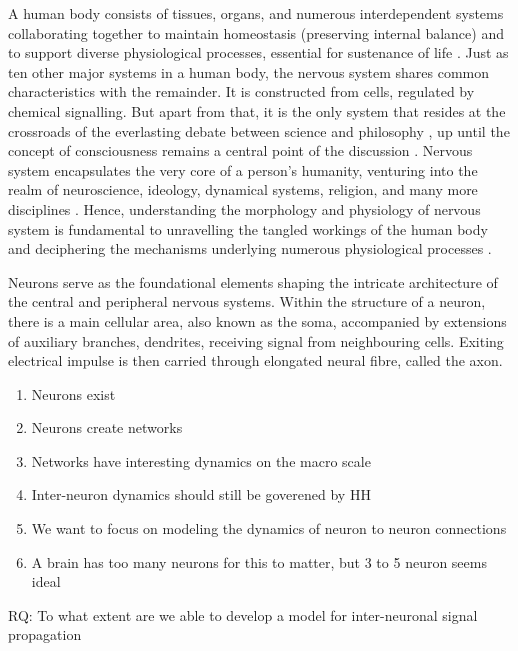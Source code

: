 \documentclass[class={myRUCProject}, crop=false]{standalone}
\begin{document}

A human body consists of tissues, organs, and numerous interdependent systems collaborating together to maintain homeostasis (preserving internal balance) and to support diverse physiological processes, essential for sustenance of life \cite{inbook2023Com}. Just as ten other major systems in a human body, the nervous system shares common characteristics with the remainder. It is constructed from cells, regulated by chemical signalling. \cite{SHOYKHET2011783} But apart from that, it is the only system that resides at the crossroads of the everlasting debate between science and philosophy \cite{SHOYKHET2011783, cons2002}, up until the concept of consciousness remains a central point of the discussion \cite{cons2002}. Nervous system encapsulates the very core of a person's humanity, venturing into the realm of neuroscience, ideology, dynamical systems, religion, and many more disciplines \cite{SHOYKHET2011783,cons2002}. Hence, understanding the morphology and physiology of nervous system is fundamental to unravelling the tangled workings of the human body and deciphering the mechanisms underlying numerous physiological processes \cite{SHOYKHET2011783}.

Neurons serve as the foundational elements shaping the intricate architecture of the central and peripheral nervous systems. \cite{shadizadeh2022investigating} Within the structure of a neuron, there is a main cellular area, also known as the soma, accompanied by extensions of auxiliary branches, dendrites, receiving signal from neighbouring cells. Exiting electrical impulse is then carried through elongated neural fibre, called the axon. \cite{njitacke2020hidden} 





\begin{enumerate}
    \item Neurons exist
    \item Neurons  create networks
    \item Networks have interesting dynamics on the macro scale
    \item Inter-neuron dynamics should still be goverened by HH
    \item We want to focus on modeling the dynamics of neuron to neuron connections
    \item A brain has too many neurons for this to matter, but 3 to 5 neuron seems ideal
\end{enumerate}

RQ: To what extent are we able to develop a model for inter-neuronal signal propagation
\end{document}
